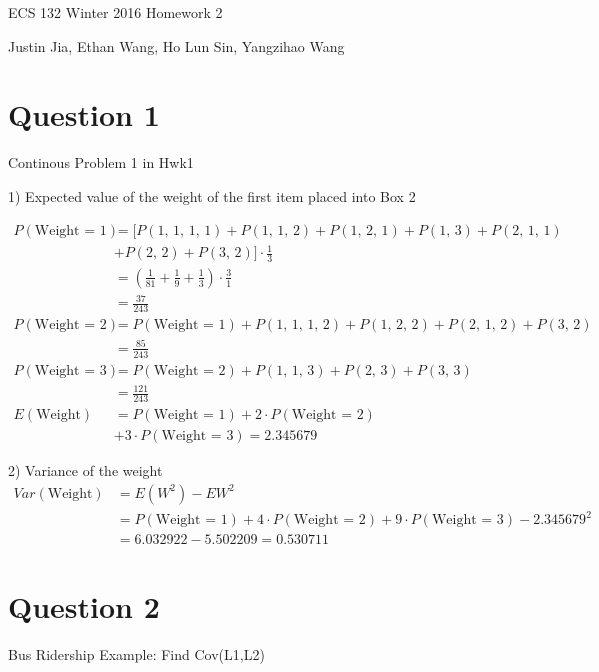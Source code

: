 \documentclass[11pt]{article}
\begin{document}
ECS 132 Winter 2016 Homework 2

Justin Jia, Ethan Wang, Ho Lun Sin, Yangzihao Wang

\section{Question 1}

Continous Problem 1 in Hwk1

1) Expected value of the weight of the first item placed into Box 2

\begin{align*}
P(\text{Weight = 1}) &= [P(\text{1, 1, 1, 1}) + P(\text{1, 1, 2}) + P(\text{1, 2, 1}) + P(\text{1, 3}) + P(\text{2, 1, 1}) \\
						&+ P(\text{2, 2}) + P(\text{3, 2})]\cdot \frac13\\
					 &= (\frac{1}{81} + \frac19 + \frac 13)\cdot \frac31\\
					 &= \frac{37}{243}\\
P(\text{Weight = 2}) &= P(\text{Weight = 1}) + P(\text{1, 1, 1, 2}) + P(\text{1, 2, 2}) + P(\text{2, 1, 2}) + P(\text{3, 2})\\
					 &= \frac{85}{243}\\
P(\text{Weight = 3}) &= P(\text{Weight = 2}) + P(\text{1, 1, 3}) + P(\text{2, 3}) + P(\text{3, 3})\\
					 &= \frac{121}{243}\\
E(\text{Weight}) &= P(\text{Weight = 1}) + 2 \cdot P(\text{Weight = 2}) \\
					 &+ 3 \cdot P(\text{Weight = 3}) = 2.345679
\end{align*}

2) Variance of the weight
\begin{align*}
Var(\text{Weight}) &= E(W^2) - EW^2\\
				  &= P(\text{Weight = 1}) + 4 \cdot P(\text{Weight = 2}) + 9 \cdot P(\text{Weight = 3}) - 2.345679^2\\
				  &= 6.032922 - 5.502209 = 0.530711
\end{align*}
\section{Question 2}

Bus Ridership Example: Find Cov(L1,L2)
\end{document}
